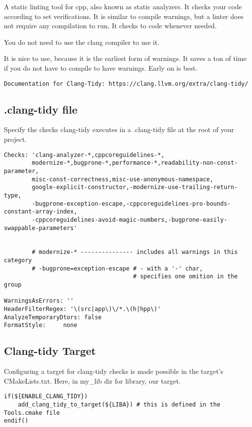 A static linting tool for cpp, also known as static analyzers. It checks your code according
to set verifications. It is similar to compile warnings, but a linter does not require any compilation
to run. It checks to code whenever needed.


You do not need to use the clang compiler to use it.


It is nice to use, because it is the earliest form of warnings. It saves a ton of time if you do not have to compile
to have warnings. Early on is best.

\begin{verbatim}
Documentation for Clang-Tidy: https://clang.llvm.org/extra/clang-tidy/
\end{verbatim}


\subsection{.clang-tidy file}

Specify the checks clang-tidy executes in a .clang-tidy file at the root of your project.

\begin{verbatim}
Checks: 'clang-analyzer-*,cppcoreguidelines-*,
        modernize-*,bugprone-*,performance-*,readability-non-const-parameter,
        misc-const-correctness,misc-use-anonymous-namespace,
        google-explicit-constructor,-modernize-use-trailing-return-type,
        -bugprone-exception-escape,-cppcoreguidelines-pro-bounds-constant-array-index,
        -cppcoreguidelines-avoid-magic-numbers,-bugprone-easily-swappable-parameters'


        # modernize-* --------------- includes all warnings in this category
        # -bugprone=exception-escape # - with a '-' char, 
                                     # specifies one omition in the group

WarningsAsErrors: ''
HeaderFilterRegex: '\(src|app\)\/*.\(h|hpp\)'
AnalyzeTemporaryDtors: false
FormatStyle:     none
\end{verbatim}


\subsection{Clang-tidy Target}

Configuring a target for clang-tidy checks is made possible in the target's CMakeLists.txt. Here, in my\_lib dir
for library, our target.


\begin{verbatim}
if(${ENABLE_CLANG_TIDY})
    add_clang_tidy_to_target(${LIBA}) # this is defined in the Tools.cmake file
endif()
\end{verbatim}

